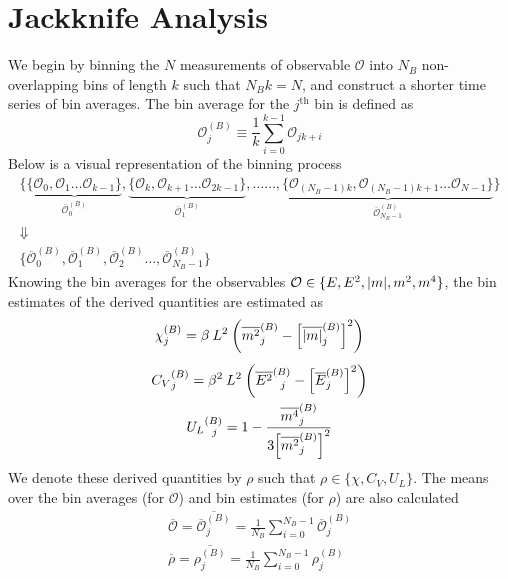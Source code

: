 \documentclass[../journal_main.tex]{subfiles}
\begin{document}
\section{Jackknife Analysis}
We begin by binning the $N$ measurements of observable $\mathcal{O}$ into $N_B$ non-overlapping bins of length $k$ such that $N_B k = N$, and construct a shorter time series of bin averages. The bin average for the $j^\text{th}$ bin is defined as
\begin{equation*}
    \mathcal{O}^{(B)}_j \equiv \frac{1}{k} \sum_{i = 0}^{k-1} \mathcal{O}_{jk+i} 
\end{equation*}
Below is a visual representation of the binning process 
\begin{gather*}
    \{\underbrace{\{\mathcal{O}_0, \mathcal{O}_1 \ldots \mathcal{O}_{k-1}\}}_{\overline{\mathcal{O}}^{(B)}_0}, \underbrace{\{\mathcal{O}_{k}, \mathcal{O}_{k+1} \ldots \mathcal{O}_{2k-1}\}}_{\overline{\mathcal{O}}^{(B)}_1}, \ldots\ldots ,\underbrace{\{\mathcal{O}_{(N_B-1)k}, \mathcal{O}_{(N_B-1)k+1} \ldots \mathcal{O}_{N-1}\}}_{\overline{\mathcal{O}}^{(B)}_{N_B-1}}\} \\
    \Downarrow \\
    \{
        \overline{\mathcal{O}}^{(B)}_0, \overline{\mathcal{O}}^{(B)}_1, \overline{\mathcal{O}}^{(B)}_2 \ldots ,\overline{\mathcal{O}}^{(B)}_{N_B-1} 
        \}
\end{gather*}
Knowing the bin averages for the observables $\mathcal{O} \in \{E, E^2, \abs{m}, m^2, m^4\}$, the bin estimates of the derived quantities are estimated as 
\begin{gather*}
    \chi^{(B)}_j = \beta \: L^2\:\qty(\overline{m^2}^{(B)}_j - \qty[\overline{|m|}^{(B)}_j]^2) \\[4pt] 
    {C_V}^{(B)}_j = \beta ^2\: L^2 \:\qty(\overline{E^2}^{(B)}_{\:\:\:j} - \qty[\overline{E}^{(B)}_j]^2) \\
    {U_L}^{(B)}_{\:\:\:j} = 1 - \frac{\overline{m^4}^{(B)}_j}{3\qty[\overline{m^2}^{(B)}_j]^2}
\end{gather*}
We denote these derived quantities by $\rho $ such that $\rho \in \{\chi , C_V, U_L\}$. The means over the bin averages (for $\mathcal{O}$) and bin estimates (for $\rho $) are also calculated
\begin{subequations}
    \begin{gather}
        \overline{\mathcal{O}} = \overline{\overline{\mathcal{O}}^{(B)}_j} = \frac{1}{N_B} \sum_{i=0}^{N_B-1} \overline{\mathcal{O}}^{(B)}_j \\
        \overline{\mathcal{\rho }} = \overline{{\rho }^{(B)}_j} = \frac{1}{N_B} \sum_{i=0}^{N_B-1} {\rho }^{(B)}_j
    \end{gather}       
    \label{binaverage} 
\end{subequations}
\end{document}
